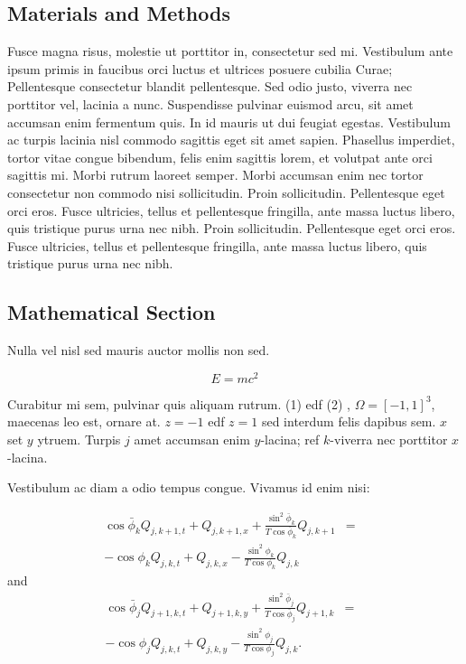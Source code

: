 \documentclass[a0,landscape]{a0poster}
\begin{document}
\begin{multicols}{3}

\section*{Materials and Methods}

Fusce magna risus, molestie ut porttitor in, consectetur sed mi. Vestibulum ante ipsum primis in faucibus orci luctus et ultrices posuere cubilia Curae; Pellentesque consectetur blandit pellentesque. Sed odio justo, viverra nec porttitor vel, lacinia a nunc. Suspendisse pulvinar euismod arcu, sit amet accumsan enim fermentum quis. In id mauris ut dui feugiat egestas. Vestibulum ac turpis lacinia nisl commodo sagittis eget sit amet sapien. Phasellus imperdiet, tortor vitae congue bibendum, felis enim sagittis lorem, et volutpat ante orci sagittis mi. Morbi rutrum laoreet semper. Morbi accumsan enim nec tortor consectetur non commodo nisi sollicitudin. Proin sollicitudin. Pellentesque eget orci eros. Fusce ultricies, tellus et pellentesque fringilla, ante massa luctus libero, quis tristique purus urna nec nibh. Proin sollicitudin. Pellentesque eget orci eros. Fusce ultricies, tellus et pellentesque fringilla, ante massa luctus libero, quis tristique purus urna nec nibh.


\subsection*{Mathematical Section}

Nulla vel nisl sed mauris auctor mollis non sed.

\begin{equation}
E = mc^{2}
\label{eqn:Einstein}
\end{equation}

Curabitur mi sem, pulvinar quis aliquam rutrum. (1) edf (2)
, $\Omega=[-1,1]^3$, maecenas leo est, ornare at. $z=-1$ edf $z=1$ sed interdum felis dapibus sem. $x$ set $y$ ytruem.
Turpis $j$ amet accumsan enim $y$-lacina;
ref $k$-viverra nec porttitor $x$-lacina.

Vestibulum ac diam a odio tempus congue. Vivamus id enim nisi:

\begin{eqnarray}
\cos\bar{\phi}_k Q_{j,k+1,t} + Q_{j,k+1,x}+\frac{\sin^2\bar{\phi}_k}{T\cos\bar{\phi}_k} Q_{j,k+1} &=&\nonumber\\
-\cos\phi_k Q_{j,k,t} + Q_{j,k,x}-\frac{\sin^2\phi_k}{T\cos\phi_k} Q_{j,k}\label{edgek}
\end{eqnarray}
and
\begin{eqnarray}
\cos\bar{\phi}_j Q_{j+1,k,t} + Q_{j+1,k,y}+\frac{\sin^2\bar{\phi}_j}{T\cos\bar{\phi}_j} Q_{j+1,k}&=&\nonumber \\
-\cos\phi_j Q_{j,k,t} + Q_{j,k,y}-\frac{\sin^2\phi_j}{T\cos\phi_j} Q_{j,k}.\label{edgej}
\end{eqnarray}


\end{multicols}
\end{document}
